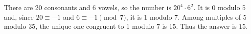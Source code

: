 There are 20 consonants and 6 vowels, so the number is $ 20^4\cdot6^2 $. It is 0 modulo 5 and, since $ 20\equiv-1 $ and $ 6\equiv-1\pmod7 $, it is 1 modulo 7. Among multiples of 5 modulo 35, the unique one congruent to 1 modulo 7 is 15. Thus the answer is $\boxed{15}$.
